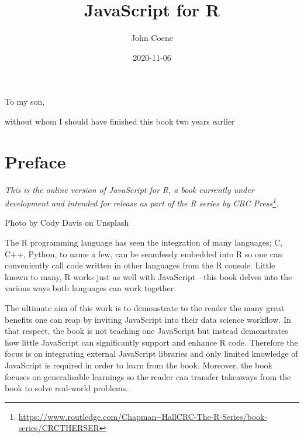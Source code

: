 \documentclass[
]{krantz}
\title{JavaScript for R}
\author{John Coene}
\date{2020-11-06}
\renewcommand{\href}[2]{#2\footnote{\url{#1}}}
\begin{document}
\maketitle


\thispagestyle{empty}

\begin{center}
To my son,

without whom I should have finished this book two years earlier
\end{center}

\setlength{\abovedisplayskip}{-5pt}
\setlength{\abovedisplayshortskip}{-5pt}

{
\hypersetup{linkcolor=}
\setcounter{tocdepth}{2}
\tableofcontents
}
\listoftables
\listoffigures
\hypertarget{preface}{%
\chapter*{Preface}\label{preface}}


\emph{This is the online version of JavaScript for R, a book currently under development and intended for release as part of the \href{https://www.routledge.com/Chapman--HallCRC-The-R-Series/book-series/CRCTHERSER}{R series by CRC Press}.}

{Photo by Cody Davis on Unsplash}

The R programming language has seen the integration of many languages; C, C++, Python, to name a few, can be seamlessly embedded into R so one can conveniently call code written in other languages from the R console. Little known to many, R works just as well with JavaScript---this book delves into the various ways both languages can work together.

The ultimate aim of this work is to demonstrate to the reader the many great benefits one can reap by inviting JavaScript into their data science workflow. In that respect, the book is not teaching one JavaScript but instead demonstrates how little JavaScript can significantly support and enhance R code. Therefore the focus is on integrating external JavaScript libraries and only limited knowledge of JavaScript is required in order to learn from the book. Moreover, the book focuses on generalisable learnings so the reader can transfer takeaways from the book to solve real-world problems.
\end{document}
